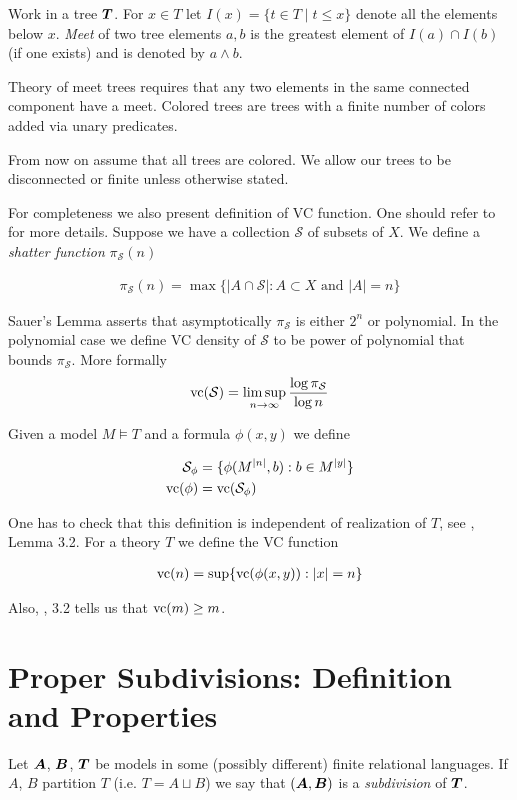 \documentclass{amsart}
\DeclareMathOperator{\TT}{\boldface T}
\DeclareMathOperator{\A}{\boldface A}
\DeclareMathOperator{\B}{\boldface B}
\newcommand{\CS}{\mathcal S}
\begin{document}
\begin{Definition}
	Work in a tree $\TT$. For $x \in T$ let $I(x) = \{t \in T \mid t \leq x\}$ denote all the elements below $x$. \emph{Meet} of two tree elements $a,b$ is the greatest element of $I(a) \cap I(b)$ (if one exists) and is denoted by $a \wedge b$.
\end{Definition}

Theory of meet trees requires that any two elements in the same connected component have a meet. Colored trees are trees with a finite number of colors added via unary predicates.

From now on assume that all trees are colored. We allow our trees to be disconnected or finite unless otherwise stated.

For completeness we also present definition of VC function.
One should refer to \cite{vc_density} for more details.
Suppose we have a collection $\CS$ of subsets of $X$. We define a \emph{shatter function} $\pi_\CS(n)$

\begin{align*}
	\pi_\CS(n) = \max \{|A \cap \CS| : A \subset X \text{ and } |A| = n\}
\end{align*}

Sauer's Lemma asserts that asymptotically $\pi_\CS$ is either $2^n$ or polynomial.
In the polynomial case we define VC density of $\CS$ to be power of polynomial that bounds $\pi_\CS$.
More formally 
\begin{align*}
	\vc(\CS) = \limsup_{n \to \infty}\frac{\log \pi_\CS}{\log n}
\end{align*}

Given a model $M \models T$ and a formula $\phi(x, y)$ we define 

\begin{align*}
	\CS_\phi &= \{\phi(M^{|n|}, b) : b \in M^{|y|}\} \\
	\vc(\phi) &=  \vc(\CS_\phi)
\end{align*}

One has to check that this definition is independent of realization of $T$, see \cite{vc_density}, Lemma 3.2. For a theory $T$ we define the VC function

\begin{align*}
	\operatorname{vc}(n) = \sup \{\operatorname{vc}(\phi(x, y)) : |x| = n\}
\end{align*}

Also, \cite{vc_density}, 3.2 tells us that $\operatorname{vc}(m) \geq m$.

\section{Proper Subdivisions: Definition and Properties}
\begin{Definition}
	Let $\A$, $\B$, $\TT$ be models in some (possibly different) finite relational languages. If $A$, $B$ partition $T$ (i.e. $T = A \sqcup B$) we say that $(\A, \B)$ is a \emph{subdivision} of $\TT$.
\end{Definition}
\end{document}
